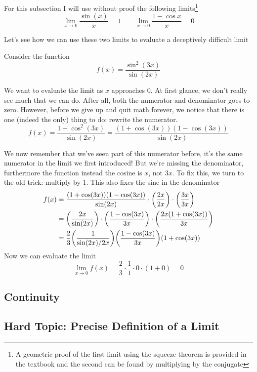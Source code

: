 \begin{Optional}
For this subsection I will use without proof the following limits\footnote{A geometric proof of the first limit using the squeeze theorem is provided in the textbook and the second can be found by multiplying by the conjugate}
\[ \lim_{x \to 0} \frac{\sin(x)}{x} = 1 \qquad \lim_{x \to 0} \frac{1 - \cos x}{x} = 0\]

Let's see how we can use these two limits to evaluate a deceptively difficult limit

\begin{example}
	Consider the function
	\[ f(x) = \frac{\sin^2(3x)}{\sin(2x)} \]
	
	We want to evaluate the limit as $x$ approaches $0$. At first glance, we don't really see much that we can do. After all, both the numerator and denominator goes to zero. However, before we give up and quit math forever, we notice that there is one (indeed the only) thing to do: rewrite the numerator. 
	\[ f(x) = \frac{1 - \cos^2(3x)}{\sin(2x)} = \frac{(1 + \cos(3x))(1 - \cos(3x))}{\sin(2x)} \]
	
	We now remember that we've seen part of this numerator before, it's the same numerator in the limit we first introduced! But we're missing the denominator, furthermore the function instead the cosine is $x$, not $3x$. To fix this, we turn to the old trick: multiply by 1. This also fixes the sine in the denominator
	\begin{align*}
		f(x) &= \frac{(1 + \cos(3x))(1 - \cos(3x))}{\sin(2x)} \cdot \qty(\frac{2x}{2x}) \cdot \qty(\frac{3x}{3x}) \\
		&= \qty(\frac{2x}{\sin(2x)}) \cdot \qty(\frac{1 - \cos(3x)}{3x}) \cdot \qty(\frac{2x(1 + \cos(3x))}{3x}) \\
		&= \frac{2}{3} \qty(\frac{1}{\sin(2x)/2x}) \qty(\frac{1 - \cos(3x)}{3x}) (1 + \cos(3x))
	\end{align*}
	Now we can evaluate the limit
	\[ \lim_{x \to 0} f(x) = \frac{2}{3} \cdot \frac{1}{1} \cdot 0 \cdot (1 + 0) = 0 \]
\end{example}

\end{Optional}

\newpage 
\subsection{Continuity}


\newpage 
\subsection{Hard Topic: Precise Definition of a Limit}

